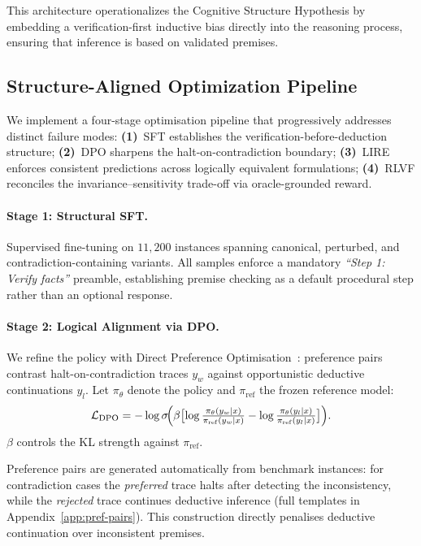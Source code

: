 \documentclass{article} %
\begin{document}
This architecture operationalizes the Cognitive Structure Hypothesis by embedding a verification-first inductive bias directly into the reasoning process, ensuring that inference is based on validated premises.

\subsection{Structure-Aligned Optimization Pipeline}
\label{sec:pipeline}

We implement a four-stage optimisation pipeline that progressively addresses distinct failure modes: \textbf{(1)}~SFT establishes the verification-before-deduction structure; \textbf{(2)}~DPO sharpens the halt-on-contradiction boundary; \textbf{(3)}~LIRE enforces consistent predictions across logically equivalent formulations; \textbf{(4)}~RLVF reconciles the invariance--sensitivity trade-off via oracle-grounded reward.

\paragraph{Stage 1: Structural SFT.} Supervised fine-tuning on $11{,}200$ instances spanning canonical, perturbed, and contradiction-containing variants. All samples enforce a mandatory \textit{``Step 1: Verify facts''} preamble, establishing premise checking as a default procedural step rather than an optional response.

\paragraph{Stage 2: Logical Alignment via DPO.} We refine the policy with Direct Preference Optimisation~\citep{rafailov2023direct}: preference pairs contrast halt-on-contradiction traces $y_w$ against opportunistic deductive continuations $y_l$. Let $\pi_\theta$ denote the policy and $\pi_{\mathrm{ref}}$ the frozen reference model:
\begin{equation}
\mathcal{L}_{\mathrm{DPO}} = -\log\sigma\!\Bigl(\beta\bigl[\log\tfrac{\pi_\theta(y_w|x)}{\pi_{\mathrm{ref}}(y_w|x)} - \log\tfrac{\pi_\theta(y_l|x)}{\pi_{\mathrm{ref}}(y_l|x)}\bigr]\Bigr).
\label{eq:dpo}
\end{equation}
$\beta$ controls the KL strength against $\pi_{\mathrm{ref}}$.

Preference pairs are generated automatically from benchmark instances: for contradiction cases the \emph{preferred} trace halts after detecting the inconsistency, while the \emph{rejected} trace continues deductive inference (full templates in Appendix~\ref{app:pref-pairs}). This construction directly penalises deductive continuation over inconsistent premises.
\end{document}
